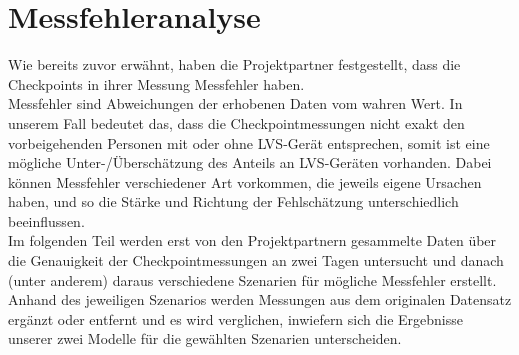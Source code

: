 \documentclass[12pt]{scrreprt}
\begin{document}
\chapter{Messfehleranalyse}
\label{chap:Messfehleranalyse}
Wie bereits zuvor erwähnt, haben die Projektpartner festgestellt, dass die Checkpoints in ihrer Messung Messfehler haben. \\
Messfehler sind Abweichungen der erhobenen Daten vom wahren Wert. In unserem Fall bedeutet das, dass die Checkpointmessungen nicht exakt den vorbeigehenden Personen mit oder ohne LVS-Gerät entsprechen, somit ist eine mögliche Unter-/Überschätzung des Anteils an LVS-Geräten vorhanden. Dabei können Messfehler verschiedener Art vorkommen, die jeweils eigene Ursachen haben, und so die Stärke und Richtung der Fehlschätzung unterschiedlich beeinflussen. \\
Im folgenden Teil werden erst von den Projektpartnern gesammelte Daten über die Genauigkeit der Checkpointmessungen an zwei Tagen untersucht und danach (unter anderem) daraus verschiedene Szenarien für mögliche Messfehler erstellt. Anhand des jeweiligen Szenarios werden Messungen aus dem originalen Datensatz ergänzt oder entfernt und es wird verglichen, inwiefern sich die Ergebnisse unserer zwei Modelle für die gewählten Szenarien unterscheiden.
\end{document}
